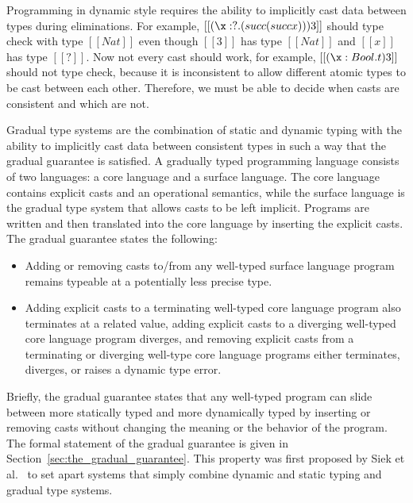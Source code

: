 Programming in dynamic style requires the ability to implicitly cast
data between types during eliminations. For example, $[[(\x:?.(succ
    (succ x))) 3]]$ should type check with type $[[Nat]]$ even though
$[[3]]$ has type $[[Nat]]$ and $[[x]]$ has type $[[?]]$. Now not every
cast should work, for example, $[[(\x:Bool.t) 3]]$ should not type check,
because it is inconsistent to allow different atomic types to be cast
between each other.  Therefore, we must be able to decide when casts
are consistent and which are not.

Gradual type systems are the combination of static and dynamic typing
with the ability to implicitly cast data between consistent types in
such a way that the gradual guarantee is satisfied.  A gradually typed
programming language consists of two languages: a core language and a
surface language.  The core language contains explicit casts and an
operational semantics, while the surface language is the gradual type
system that allows casts to be left implicit.  Programs are written
and then translated into the core language by inserting the explicit
casts.  The gradual guarantee states the following:
\begin{itemize}
\item Adding or removing casts to/from any well-typed surface language
  program remains typeable at a potentially less precise type.
\item Adding explicit casts to a terminating well-typed core language
  program also terminates at a related value, adding explicit casts to
  a diverging well-typed core language program diverges, and removing
  explicit casts from a terminating or diverging well-type core
  language programs either terminates, diverges, or raises a dynamic
  type error.
\end{itemize}
Briefly, the gradual guarantee states that any well-typed program can
slide between more statically typed and more dynamically typed by
inserting or removing casts without changing the meaning or the
behavior of the program. The formal statement of the gradual guarantee
is given in Section~\ref{sec:the_gradual_guarantee}.  This property
was first proposed by Siek et al.~\cite{Siek:2015} to set apart
systems that simply combine dynamic and static typing and gradual type
systems.

